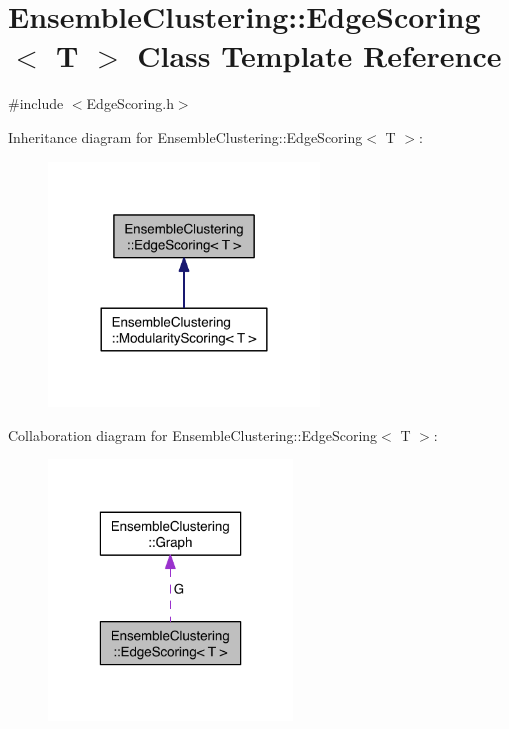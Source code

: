 \hypertarget{class_ensemble_clustering_1_1_edge_scoring}{\section{Ensemble\-Clustering\-:\-:Edge\-Scoring$<$ T $>$ Class Template Reference}
\label{class_ensemble_clustering_1_1_edge_scoring}
}


{\ttfamily \#include $<$Edge\-Scoring.\-h$>$}



Inheritance diagram for Ensemble\-Clustering\-:\-:Edge\-Scoring$<$ T $>$\-:
\nopagebreak
\begin{figure}[H]
\begin{center}
\leavevmode
\includegraphics[width=204pt]{class_ensemble_clustering_1_1_edge_scoring__inherit__graph}
\end{center}
\end{figure}


Collaboration diagram for Ensemble\-Clustering\-:\-:Edge\-Scoring$<$ T $>$\-:
\nopagebreak
\begin{figure}[H]
\begin{center}
\leavevmode
\includegraphics[width=184pt]{class_ensemble_clustering_1_1_edge_scoring__coll__graph}
\end{center}
\end{figure}
